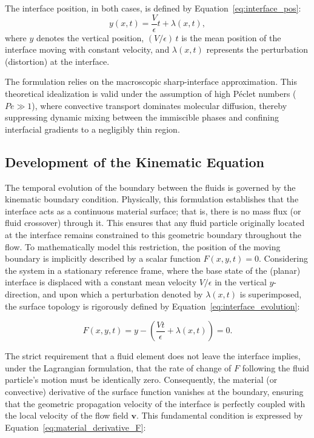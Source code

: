 The interface position, in both cases, is defined by Equation~\ref{eq:interface_pos}:
\begin{equation} \label{eq:interface_pos}
    y(x,t) = \frac{V}{\epsilon} t + \lambda(x,t),
\end{equation}
where $y$ denotes the vertical position, $(V/\epsilon)\,t$ is the mean position of the interface moving with constant velocity, and $\lambda(x,t)$ represents the perturbation (distortion) at the interface.

The formulation relies on the macroscopic sharp-interface approximation. This theoretical idealization is valid under the assumption of high Péclet numbers ($Pe \gg 1$), where convective transport dominates molecular diffusion, thereby suppressing dynamic mixing between the immiscible phases and confining interfacial gradients to a negligibly thin region.

\subsection{Development of the Kinematic Equation}

The temporal evolution of the boundary between the fluids is governed by the kinematic boundary condition. Physically, this formulation establishes that the interface acts as a continuous material surface; that is, there is no mass flux (or fluid crossover) through it. This ensures that any fluid particle originally located at the interface remains constrained to this geometric boundary throughout the flow. To mathematically model this restriction, the position of the moving boundary is implicitly described by a scalar function $F(x,y,t) = 0$. Considering the system in a stationary reference frame, where the base state of the (planar) interface is displaced with a constant mean velocity $V/\epsilon$ in the vertical $y$-direction, and upon which a perturbation denoted by $\lambda (x,t)$ is superimposed, the surface topology is rigorously defined by Equation~\ref{eq:interface_evolution}:

\begin{equation}
\label{eq:interface_evolution}
F(x,y,t) = y - \left( \frac{V t}{\epsilon} + \lambda(x,t) \right) = 0.
\end{equation}

The strict requirement that a fluid element does not leave the interface implies, under the Lagrangian formulation, that the rate of change of $F$ following the fluid particle's motion must be identically zero. Consequently, the material (or convective) derivative of the surface function vanishes at the boundary, ensuring that the geometric propagation velocity of the interface is perfectly coupled with the local velocity of the flow field $\mathbf{v}$. This fundamental condition is expressed by Equation~\ref{eq:material_derivative_F}:

